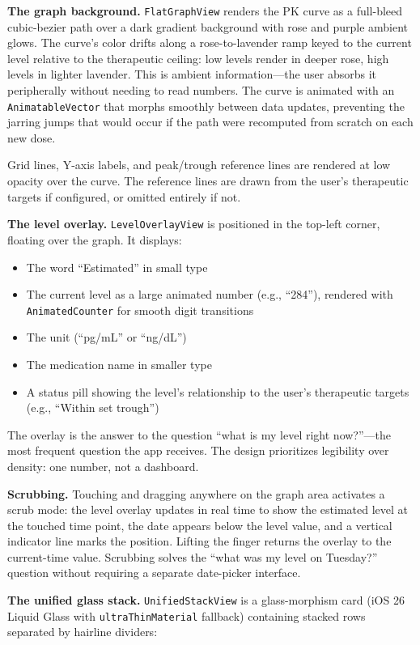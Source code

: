 \documentclass[11pt,a4paper]{article}
\newcommand{\code}[1]{\texttt{\small #1}}
\begin{document}
\textbf{The graph background.} \code{FlatGraphView} renders the PK curve
as a full-bleed cubic-bezier path over a dark gradient background with
rose and purple ambient glows. The curve's color drifts along a
rose-to-lavender ramp keyed to the current level relative to the
therapeutic ceiling: low levels render in deeper rose, high levels in
lighter lavender. This is ambient information---the user absorbs it
peripherally without needing to read numbers. The curve is animated with
an \code{AnimatableVector} that morphs smoothly between data updates,
preventing the jarring jumps that would occur if the path were recomputed
from scratch on each new dose.

Grid lines, Y-axis labels, and peak/trough reference lines are rendered
at low opacity over the curve. The reference lines are drawn from the
user's therapeutic targets if configured, or omitted entirely if not.

\textbf{The level overlay.} \code{LevelOverlayView} is positioned in the
top-left corner, floating over the graph. It displays:
\begin{itemize}[nosep,leftmargin=1.4em]
\item The word ``Estimated'' in small type
\item The current level as a large animated number (e.g., ``284''),
  rendered with \code{AnimatedCounter} for smooth digit transitions
\item The unit (``pg/mL'' or ``ng/dL'')
\item The medication name in smaller type
\item A status pill showing the level's relationship to the user's
  therapeutic targets (e.g., ``Within set trough'')
\end{itemize}

The overlay is the answer to the question ``what is my level right
now?''---the most frequent question the app receives. The design
prioritizes legibility over density: one number, not a dashboard.

\textbf{Scrubbing.} Touching and dragging anywhere on the graph area
activates a scrub mode: the level overlay updates in real time to show
the estimated level at the touched time point, the date appears below the
level value, and a vertical indicator line marks the position. Lifting
the finger returns the overlay to the current-time value. Scrubbing
solves the ``what was my level on Tuesday?'' question without requiring a
separate date-picker interface.

\textbf{The unified glass stack.} \code{UnifiedStackView} is a
glass-morphism card (iOS 26 Liquid Glass with \code{ultraThinMaterial}
fallback) containing stacked rows separated by hairline dividers:
\end{document}
